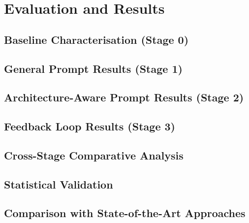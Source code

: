 \chapter{Evaluation and Results}\label{ch:evaluation}

\section{Baseline Characterisation (Stage 0)}
\label{sec:eval:stage0}

\section{General Prompt Results (Stage 1)}
\label{sec:eval:stage1}

\section{Architecture-Aware Prompt Results (Stage 2)}
\label{sec:eval:stage2}

\section{Feedback Loop Results (Stage 3)}
\label{sec:eval:stage3}

\section{Cross-Stage Comparative Analysis}
\label{sec:eval:cross_stage}

\section{Statistical Validation}
\label{sec:eval:statistical_validation}

\section{Comparison with State-of-the-Art Approaches}
\label{sec:eval:sota_comparison}


